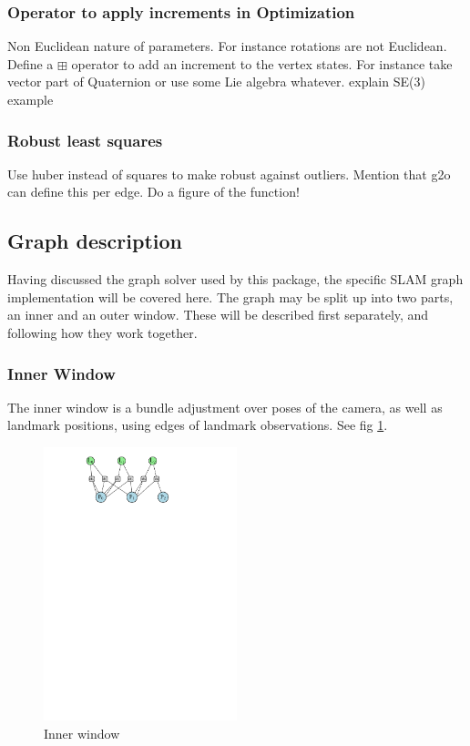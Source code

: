 \subsubsection{Operator to apply increments in Optimization}
Non Euclidean nature of parameters.  For instance rotations are not Euclidean.  Define a $\boxplus$ operator to add an increment to the vertex states.  For instance take vector part of Quaternion or use some Lie algebra whatever. explain SE(3) example 

\subsubsection{Robust least squares}
Use huber instead of squares to make robust against outliers.  Mention that g2o can define this per edge.  Do a figure of the function!

\subsection{Graph description}

Having discussed the graph solver used by this package, the specific SLAM graph implementation will be covered here.  The graph may be split up into two parts, an inner and an outer window.  These will be described first separately, and following how they work together.

\subsubsection{Inner Window}

The inner window is a bundle adjustment over poses of the camera, as well as landmark positions, using edges of landmark observations.  See fig \ref{fig:inner_window}.

\begin{figure}[h!]
  \centering
    \includegraphics[width=0.5\textwidth]{chapters/images/inner_window}
  \caption{Inner window}
  \label{fig:inner_window}
\end{figure}

